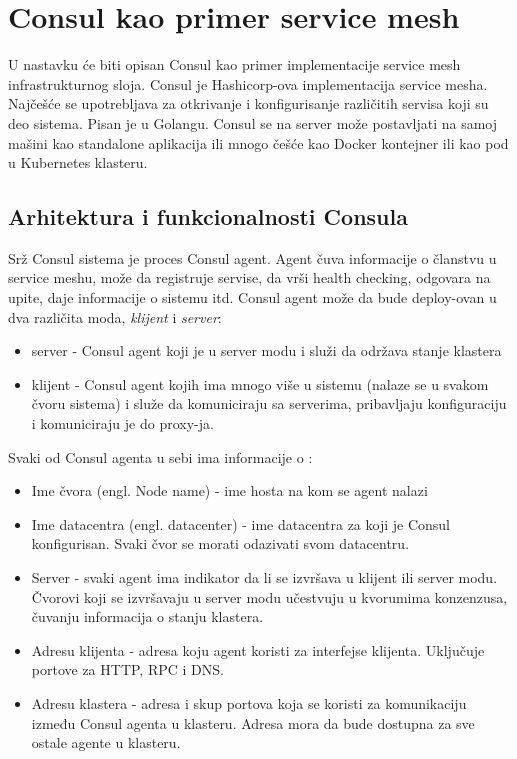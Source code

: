 \documentclass[a4paper,12pt]{report}
\begin{document}
\chapter{Consul kao primer service mesh}

U nastavku će biti opisan Consul kao primer implementacije service mesh infrastrukturnog sloja. Consul je Hashicorp-ova implementacija service mesha. Najčešće se upotrebljava za otkrivanje i konfigurisanje različitih servisa koji su deo sistema. Pisan je u Golangu. Consul se na server može postavljati na samoj mašini kao standalone aplikacija ili mnogo češće kao Docker kontejner ili kao pod u Kubernetes klasteru. 

\section{Arhitektura i funkcionalnosti Consula}

Srž Consul sistema je proces Consul agent. Agent čuva informacije o članstvu u service meshu, može da registruje servise, da vrši health checking, odgovara na upite, daje informacije o sistemu itd. Consul agent može da bude deploy-ovan u dva različita moda, \textit{klijent} i \textit{server}: 

\begin{itemize}
	\item server - Consul agent koji je u server modu i služi da održava stanje klastera
	\item klijent - Consul agent kojih ima mnogo više u sistemu (nalaze se u svakom čvoru sistema) i služe da komuniciraju sa serverima, pribavljaju konfiguraciju i komuniciraju je do proxy-ja. 
\end{itemize}

Svaki od Consul agenta u sebi ima informacije o : 

\begin{itemize}
	\item Ime čvora (engl. Node name) - ime hosta na kom se agent nalazi
	\item Ime datacentra (engl. datacenter) - ime datacentra za koji je Consul konfigurisan. Svaki čvor se morati odazivati svom datacentru. 
	\item Server - svaki agent ima indikator da li se izvršava u klijent ili server modu. Čvorovi koji se izvršavaju u server modu učestvuju u kvorumima konzenzusa, čuvanju informacija o stanju klastera. 
	\item Adresu klijenta - adresa koju agent koristi za interfejse klijenta. Uključuje portove za HTTP, RPC i DNS. 
	\item Adresu klastera - adresa i skup portova koja se koristi za komunikaciju između Consul agenta u klasteru. Adresa mora da bude dostupna za sve ostale agente u klasteru.
\end{itemize}
\end{document}

